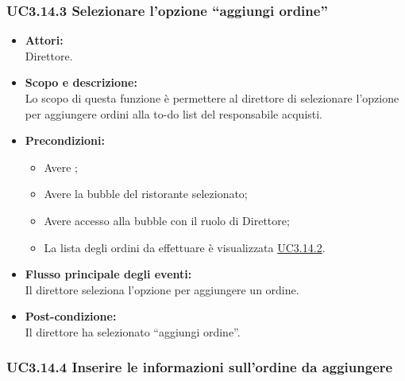 \subsubsection{UC3.14.3 Selezionare l’opzione “aggiungi ordine”} \label{UC3.14.3}

\begin{itemize}
	\item \textbf{Attori:}
	\\Direttore.
	\item \textbf{Scopo e descrizione:} 
	\\Lo scopo di questa funzione è permettere al direttore di selezionare l’opzione per aggiungere ordini alla to-do list del responsabile acquisti.
	\item \textbf{Precondizioni:}
	\begin{itemize}
		\item Avere ;
		\item Avere la bubble del ristorante selezionato;
		\item Avere accesso alla bubble con il ruolo di Direttore;
		\item La lista degli ordini da effettuare è visualizzata \hyperref[UC3.14.2]{UC3.14.2}.
	\end{itemize}
	\item \textbf{Flusso principale degli eventi:}
	\\Il direttore seleziona l’opzione per aggiungere un ordine.
	\item \textbf{Post-condizione:}
	\\Il direttore ha selezionato “aggiungi ordine”.
\end{itemize}

\subsubsection{UC3.14.4 Inserire le informazioni sull’ordine da aggiungere} \label{UC3.14.4}

